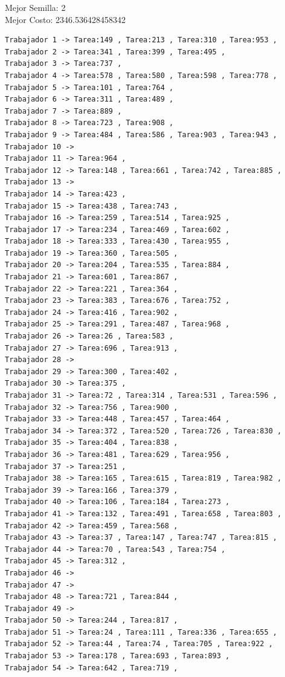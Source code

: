 \documentclass{article}
\begin{document}
Mejor Semilla: 2\\
Mejor Costo: 2346.536428458342\\
\begin{lstlisting}
Trabajador 1 -> Tarea:149 , Tarea:213 , Tarea:310 , Tarea:953 , 
Trabajador 2 -> Tarea:341 , Tarea:399 , Tarea:495 , 
Trabajador 3 -> Tarea:737 , 
Trabajador 4 -> Tarea:578 , Tarea:580 , Tarea:598 , Tarea:778 , 
Trabajador 5 -> Tarea:101 , Tarea:764 , 
Trabajador 6 -> Tarea:311 , Tarea:489 , 
Trabajador 7 -> Tarea:889 , 
Trabajador 8 -> Tarea:723 , Tarea:908 , 
Trabajador 9 -> Tarea:484 , Tarea:586 , Tarea:903 , Tarea:943 , 
Trabajador 10 -> 
Trabajador 11 -> Tarea:964 , 
Trabajador 12 -> Tarea:148 , Tarea:661 , Tarea:742 , Tarea:885 , 
Trabajador 13 -> 
Trabajador 14 -> Tarea:423 , 
Trabajador 15 -> Tarea:438 , Tarea:743 , 
Trabajador 16 -> Tarea:259 , Tarea:514 , Tarea:925 , 
Trabajador 17 -> Tarea:234 , Tarea:469 , Tarea:602 , 
Trabajador 18 -> Tarea:333 , Tarea:430 , Tarea:955 , 
Trabajador 19 -> Tarea:360 , Tarea:505 , 
Trabajador 20 -> Tarea:204 , Tarea:535 , Tarea:884 , 
Trabajador 21 -> Tarea:601 , Tarea:867 , 
Trabajador 22 -> Tarea:221 , Tarea:364 , 
Trabajador 23 -> Tarea:383 , Tarea:676 , Tarea:752 , 
Trabajador 24 -> Tarea:416 , Tarea:902 , 
Trabajador 25 -> Tarea:291 , Tarea:487 , Tarea:968 , 
Trabajador 26 -> Tarea:26 , Tarea:583 , 
Trabajador 27 -> Tarea:696 , Tarea:913 , 
Trabajador 28 -> 
Trabajador 29 -> Tarea:300 , Tarea:402 , 
Trabajador 30 -> Tarea:375 , 
Trabajador 31 -> Tarea:72 , Tarea:314 , Tarea:531 , Tarea:596 , 
Trabajador 32 -> Tarea:756 , Tarea:900 , 
Trabajador 33 -> Tarea:448 , Tarea:457 , Tarea:464 , 
Trabajador 34 -> Tarea:372 , Tarea:520 , Tarea:726 , Tarea:830 , 
Trabajador 35 -> Tarea:404 , Tarea:838 , 
Trabajador 36 -> Tarea:481 , Tarea:629 , Tarea:956 , 
Trabajador 37 -> Tarea:251 , 
Trabajador 38 -> Tarea:165 , Tarea:615 , Tarea:819 , Tarea:982 , 
Trabajador 39 -> Tarea:166 , Tarea:379 , 
Trabajador 40 -> Tarea:106 , Tarea:184 , Tarea:273 , 
Trabajador 41 -> Tarea:132 , Tarea:491 , Tarea:658 , Tarea:803 , 
Trabajador 42 -> Tarea:459 , Tarea:568 , 
Trabajador 43 -> Tarea:37 , Tarea:147 , Tarea:747 , Tarea:815 , 
Trabajador 44 -> Tarea:70 , Tarea:543 , Tarea:754 , 
Trabajador 45 -> Tarea:312 , 
Trabajador 46 -> 
Trabajador 47 -> 
Trabajador 48 -> Tarea:721 , Tarea:844 , 
Trabajador 49 -> 
Trabajador 50 -> Tarea:244 , Tarea:817 , 
Trabajador 51 -> Tarea:24 , Tarea:111 , Tarea:336 , Tarea:655 , 
Trabajador 52 -> Tarea:44 , Tarea:74 , Tarea:705 , Tarea:922 , 
Trabajador 53 -> Tarea:178 , Tarea:693 , Tarea:893 , 
Trabajador 54 -> Tarea:642 , Tarea:719 , 

\end{lstlisting}
\end{document}
